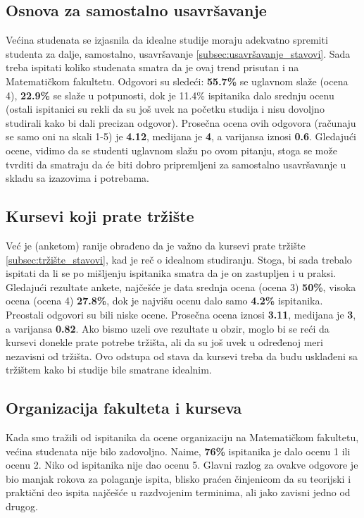 \documentclass[a4paper]{article}
\begin{document}
{\subsection{Osnova za samostalno usavršavanje}
\label{subsec:usavršavanje_iskustva}
Većina studenata se izjasnila da idealne studije moraju adekvatno spremiti studenta za dalje, samostalno, usavršavanje \ref{subsec:usavršavanje_stavovi}. Sada treba ispitati koliko studenata smatra da je ovaj trend prisutan i na Matematičkom fakultetu.
Odgovori su sledeći: \textbf{55.7\%} se uglavnom slaže (ocena 4), \textbf{22.9\%} se slaže u potpunosti, dok je 11.4\% ispitanika dalo srednju ocenu (ostali ispitanici su rekli da su još uvek na početku studija i nisu dovoljno studirali kako bi dali precizan odgovor). Prosečna ocena ovih odgovora (računaju se samo oni na skali 1-5) je \textbf{4.12}, medijana je \textbf{4}, a varijansa iznosi \textbf{0.6}. Gledajući ocene, vidimo da se studenti uglavnom slažu po ovom pitanju, stoga se može tvrditi da smatraju da će biti dobro pripremljeni za samostalno usavršavanje u skladu sa izazovima i potrebama.


\subsection{Kursevi koji prate tržište}
\label{subsec:tržište_iskustva}

Već je (anketom) ranije obrađeno da je važno da kursevi prate tržište \ref{subsec:tržište_stavovi}, kad je reč o idealnom studiranju. Stoga, bi sada trebalo ispitati da li se po mišljenju ispitanika smatra da je on zastupljen i u praksi. Gledajući rezultate ankete, najčešće je data srednja ocena (ocena 3) \textbf{50\%}, visoka ocena (ocena 4) \textbf{27.8\%}, dok je najvišu ocenu dalo samo \textbf{4.2\%} ispitanika. Preostali odgovori su bili niske ocene. Prosečna ocena iznosi \textbf{3.11}, medijana je \textbf{3}, a varijansa \textbf{0.82}. Ako bismo uzeli ove rezultate u obzir, moglo bi se reći da kursevi donekle prate potrebe tržišta, ali da su još uvek u određenoj meri nezavisni od tržišta. Ovo odstupa od stava da kursevi treba da budu usklađeni sa tržištem kako bi studije bile smatrane idealnim.

\subsection{Organizacija fakulteta i kurseva}
\label{subsec:organizacija_iskustva}

Kada smo tražili od ispitanika da ocene organizaciju na Matematičkom fakultetu, većina studenata nije bilo zadovoljno. Naime, \textbf{76\%} ispitanika je dalo ocenu 1 ili ocenu 2. Niko od ispitanika nije dao ocenu 5. Glavni razlog za ovakve odgovore je bio manjak rokova za polaganje ispita, blisko praćen činjenicom da su teorijski i praktični deo ispita najčešće u razdvojenim terminima, ali jako zavisni jedno od drugog.

}
\end{document}
